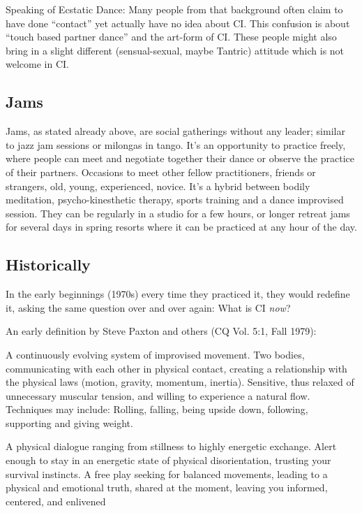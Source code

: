 Speaking of Ecstatic Dance: Many people from that background often claim to have done ``contact'' yet actually have no idea about CI.
This confusion is about ``touch based partner dance'' and the art-form of CI.
These people might also bring in a slight different (sensual-sexual, maybe Tantric) attitude which is not welcome in CI.

\subsection{Jams}\label{subsec:jams}

Jams, as stated already above, are social gatherings without any leader; similar to jazz jam sessions or milongas in tango.
It's an opportunity to practice freely, where people can meet and negotiate together their dance or observe the practice of their partners.
Occasions to meet other fellow practitioners, friends or strangers, old, young, experienced, novice.
It's a hybrid between bodily meditation, psycho-kinesthetic therapy, sports training and a dance improvised session.
They can be regularly in a studio for a few hours, or longer retreat jams for several days in spring resorts where it can be practiced at any hour of the day.

\subsection{Historically}\label{subsec:historically}

In the early beginnings (1970s) every time they practiced it, they would redefine it, asking the same question over and over again: What is CI \textit{now}?

An early definition by Steve Paxton and others (CQ Vol. 5:1, Fall 1979):

A continuously evolving system of improvised movement.
Two bodies, communicating with each other in physical contact, creating a relationship with the physical laws (motion, gravity, momentum, inertia).
Sensitive, thus relaxed of unnecessary muscular tension, and willing to experience a natural flow.
Techniques may include: Rolling, falling, being upside down, following, supporting and giving weight.

A physical dialogue ranging from stillness to highly energetic exchange.
Alert enough to stay in an energetic state of physical disorientation, trusting your survival instincts.
A free play seeking for balanced movements, leading to a physical and emotional truth, shared at the moment, leaving you informed, centered, and enlivened

